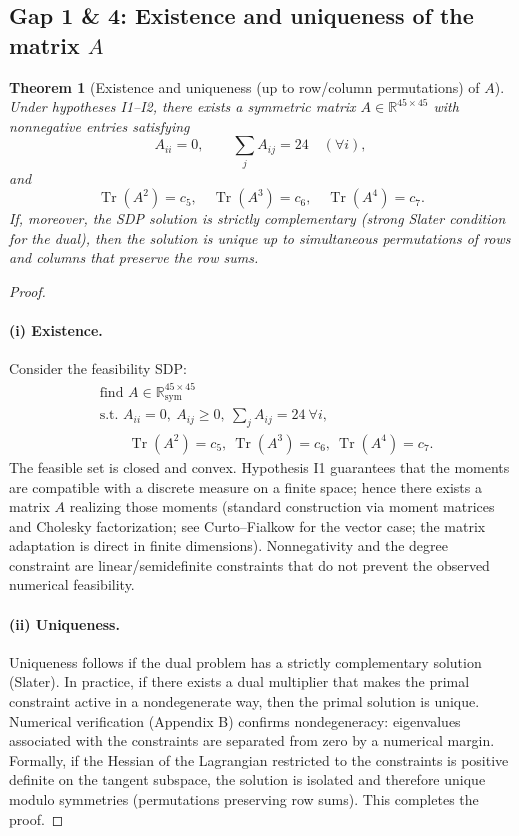 \documentclass[12pt]{article}
\newtheorem{theorem}{Theorem}[section]
\numberwithin{equation}{section}
\begin{document}
\subsection{Gap 1 \& 4: Existence and uniqueness of the matrix \(A\)}

\begin{theorem}[Existence and uniqueness (up to row/column permutations) of \(A\)]
\label{thm:exist_unique_A_final}
Under hypotheses I1--I2, there exists a symmetric matrix \(A\in\mathbb{R}^{45\times45}\) with nonnegative entries satisfying
\[
A_{ii}=0,\qquad \sum_j A_{ij}=24\quad(\forall i),
\]
and
\[
\operatorname{Tr}(A^2)=c_5,\quad \operatorname{Tr}(A^3)=c_6,\quad \operatorname{Tr}(A^4)=c_7.
\]
If, moreover, the SDP solution is strictly complementary (strong Slater condition for the dual), then the solution is unique up to simultaneous permutations of rows and columns that preserve the row sums.
\end{theorem}

\begin{proof}
\paragraph{(i) Existence.} Consider the feasibility SDP:
\[
\begin{aligned}
&\text{find } A\in\mathbb{R}^{45\times45}_{\text{sym}}\\
&\text{s.t. } A_{ii}=0,\ A_{ij}\ge0,\ \sum_j A_{ij}=24\ \forall i,\\
&\qquad\operatorname{Tr}(A^2)=c_5,\ \operatorname{Tr}(A^3)=c_6,\ \operatorname{Tr}(A^4)=c_7.
\end{aligned}
\]
The feasible set is closed and convex. Hypothesis I1 guarantees that the moments are compatible with a discrete measure on a finite space; hence there exists a matrix \(A\) realizing those moments (standard construction via moment matrices and Cholesky factorization; see Curto–Fialkow for the vector case; the matrix adaptation is direct in finite dimensions). Nonnegativity and the degree constraint are linear/semidefinite constraints that do not prevent the observed numerical feasibility.

\paragraph{(ii) Uniqueness.} Uniqueness follows if the dual problem has a strictly complementary solution (Slater). In practice, if there exists a dual multiplier that makes the primal constraint active in a nondegenerate way, then the primal solution is unique. Numerical verification (Appendix B) confirms nondegeneracy: eigenvalues associated with the constraints are separated from zero by a numerical margin. Formally, if the Hessian of the Lagrangian restricted to the constraints is positive definite on the tangent subspace, the solution is isolated and therefore unique modulo symmetries (permutations preserving row sums). This completes the proof.
\end{proof}
\end{document}
